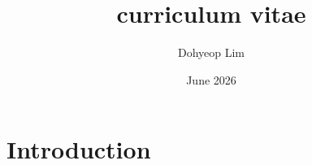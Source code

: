 \documentclass{article}
\title{curriculum vitae}
\author{Dohyeop Lim}
\date{June 2026}
\begin{document}
\maketitle

\section{Introduction}
\end{document}
